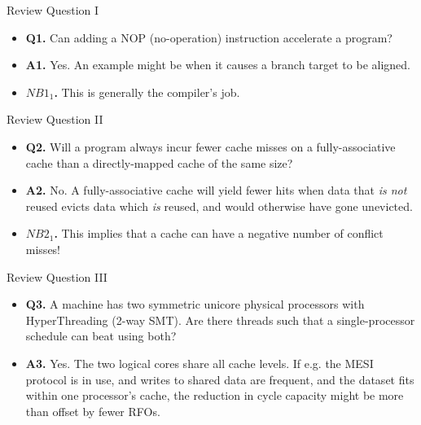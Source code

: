 \documentclass[handout]{beamer}
\begin{document}
\begin{frame}{Review Question I}
\begin{itemize}
\item \textbf{Q1.} Can adding a NOP (no-operation) instruction accelerate a program?
\item \textbf{A1.} Yes. An example might be when it causes a branch target to 
 be aligned.
\item \textbf{$NB1_1$.} This is generally the compiler's job.
\end{itemize}
\end{frame}

\begin{frame}{Review Question II}
\begin{itemize}
\item \textbf{Q2.} Will a program always incur fewer cache misses on a fully-associative
	cache than a directly-mapped cache of the same size?
\item \textbf{A2.} No. A fully-associative cache will yield fewer hits when
  data that \textit{is not} reused evicts data which \textit{is} reused, and
  would otherwise have gone unevicted.
\item \textbf{$NB2_1$.} This implies that a cache can have a
  negative number of conflict misses!
\end{itemize}
\end{frame}

\begin{frame}{Review Question III}
\begin{itemize}
\item \textbf{Q3.} A machine has two symmetric unicore physical processors with HyperThreading
	(2-way SMT). Are there threads such that a single-processor
	schedule can beat using both?
\item \textbf{A3.} Yes. The two logical cores share all cache levels. If e.g.
	the MESI protocol is in use, and writes to shared data are frequent,
	and the dataset fits within one processor's cache, the reduction in
	cycle capacity might be more than offset by fewer RFOs. 
\end{itemize}
\end{frame}
\end{document}
